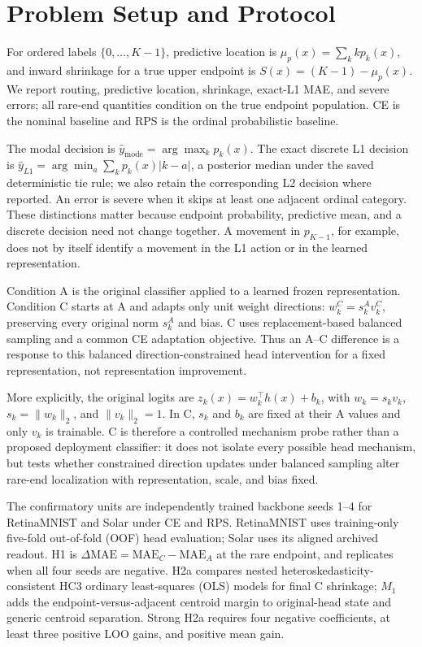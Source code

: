 \section{Problem Setup and Protocol}
For ordered labels \(\{0,\ldots,K-1\}\), predictive location is \(\mu_p(x)=\sum_k kp_k(x)\), and inward shrinkage for a true upper endpoint is \(S(x)=(K-1)-\mu_p(x)\). We report routing, predictive location, shrinkage, exact-L1 MAE, and severe errors; all rare-end quantities condition on the true endpoint population. CE is the nominal baseline and RPS is the ordinal probabilistic baseline.

The modal decision is \(\hat y_{\mathrm{mode}}=\arg\max_k p_k(x)\). The exact discrete L1 decision is \(\hat y_{L1}=\arg\min_a\sum_kp_k(x)|k-a|\), a posterior median under the saved deterministic tie rule; we also retain the corresponding L2 decision where reported. An error is severe when it skips at least one adjacent ordinal category. These distinctions matter because endpoint probability, predictive mean, and a discrete decision need not change together. A movement in \(p_{K-1}\), for example, does not by itself identify a movement in the L1 action or in the learned representation.

Condition A is the original classifier applied to a learned frozen representation. Condition C starts at A and adapts only unit weight directions: \(w_k^C=s_k^A v_k^C\), preserving every original norm \(s_k^A\) and bias. C uses replacement-based balanced sampling and a common CE adaptation objective. Thus an A--C difference is a response to this balanced direction-constrained head intervention for a fixed representation, not representation improvement.

More explicitly, the original logits are \(z_k(x)=w_k^\top h(x)+b_k\), with \(w_k=s_kv_k\), \(s_k=\lVert w_k\rVert_2\), and \(\lVert v_k\rVert_2=1\). In C, \(s_k\) and \(b_k\) are fixed at their A values and only \(v_k\) is trainable. C is therefore a controlled mechanism probe rather than a proposed deployment classifier: it does not isolate every possible head mechanism, but tests whether constrained direction updates under balanced sampling alter rare-end localization with representation, scale, and bias fixed.

The confirmatory units are independently trained backbone seeds 1--4 for RetinaMNIST and Solar under CE and RPS. RetinaMNIST uses training-only five-fold out-of-fold (OOF) head evaluation; Solar uses its aligned archived readout. H1 is \(\Delta\mathrm{MAE}=\mathrm{MAE}_C-\mathrm{MAE}_A\) at the rare endpoint, and replicates when all four seeds are negative. H2a compares nested heteroskedasticity-consistent HC3 ordinary least-squares (OLS) models for final C shrinkage; \(M_1\) adds the endpoint-versus-adjacent centroid margin to original-head state and generic centroid separation. Strong H2a requires four negative coefficients, at least three positive LOO gains, and positive mean gain.

